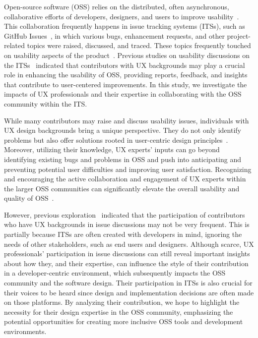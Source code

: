 Open-source software (OSS) relies on the distributed, often asynchronous, collaborative efforts of developers, designers, and users to improve usability~\cite{wang2020open, Cheng2018, Hellman2022}. This collaboration frequently happens in issue tracking systems (ITSs), such as GitHub Issues~\cite{githubGitHubIssues}, in which various bugs, enhancement requests, and other project-related topics were raised, discussed, and traced. These topics frequently touched on usability aspects of the product~\cite{sanei2023characterizing}. Previous studies on usability discussions on the ITSs~\cite{Cheng2018, sanei2023characterizing} indicated that contributors with UX backgrounds may play a crucial role in enhancing the usability of OSS, providing reports, feedback, and insights that contribute to user-centered improvements. In this study, we investigate the impacts of UX professionals and their expertise in collaborating with the OSS community within the ITS. 

While many contributors may raise and discuss usability issues, individuals with UX design backgrounds bring a unique perspective. They do not only identify problems but also offer solutions rooted in user-centric design principles~\cite{ccetin2007analysis}. Moreover, utilizing their knowledge, UX experts' inputs can go beyond identifying existing bugs and problems in OSS and push into anticipating and preventing potential user difficulties and improving user satisfaction. Recognizing and encouraging the active collaboration and engagement of UX experts within the larger OSS communities can significantly elevate the overall usability and quality of OSS~\cite{hedberg2009integrating, khalajzadeh2022diverse, Rajanen2023Usability}. 

However, previous exploration~\cite{sanei2023characterizing} indicated that the participation of contributors who have UX backgrounds in issue discussions may not be very frequent. This is partially because ITSs are often created with developers in mind, ignoring the needs of other stakeholders, such as end users and designers. Although scarce, UX professionals' participation in issue discussions can still reveal important insights about how they, and their expertise, can influence the style of their contribution in a developer-centric environment, which subsequently impacts the OSS community and the software design. Their participation in ITSs is also crucial for their voices to be heard since design and implementation decisions are often made on those platforms. By analyzing their contribution, we hope to highlight the necessity for their design expertise in the OSS community, emphasizing the potential opportunities for creating more inclusive OSS tools and development environments.

